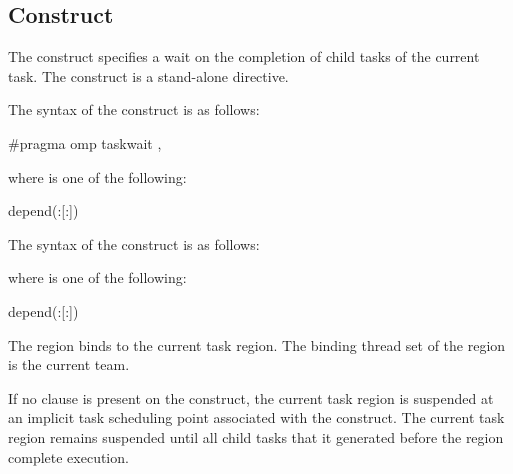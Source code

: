 \subsection{ Construct}
\label{subsec:taskwait Construct}
\summary
The  construct specifies a wait on the completion of child tasks
of the current task. The  construct is a stand-alone directive.

\syntax
\begin{ccppspecific}
The syntax of the  construct is as follows:

\begin{ompcPragma}
#pragma omp taskwait \plc{[clause[ [},\plc{] clause] ... ] new-line}
\end{ompcPragma}

where  is one of the following:

\begin{indentedcodelist}
depend(:[:])
\end{indentedcodelist}
\end{ccppspecific}

\begin{fortranspecific}
The syntax of the  construct is as follows:


where  is one of the following:

\begin{indentedcodelist}
depend(:[:])
\end{indentedcodelist}

\end{fortranspecific}

\binding
The  region binds to the current task region. The binding thread set of the
 region is the current team.

\descr

If no  clause is present on the  construct, the
current task region is suspended at an implicit task scheduling point
associated with the construct. The current task region remains suspended until
all child tasks that it generated before the  region complete
execution.

